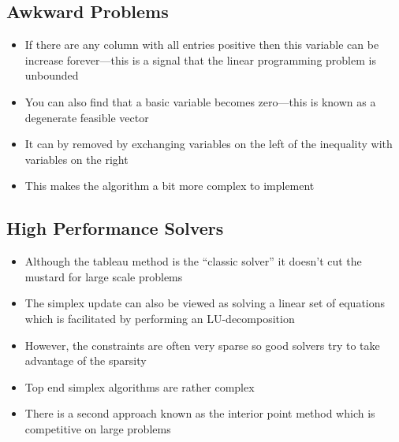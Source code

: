\begin{slide}
\section{Awkward Problems}

\begin{PauseHighLight}
  \begin{itemize}
  \item If there are any column with all entries positive then this
    variable can be increase forever---this is a signal that the linear
    programming problem is unbounded\pause
  \item You can also find that a basic variable becomes zero---this is
    known as a degenerate feasible vector\pause
  \item It can by removed by exchanging variables on the left of the
    inequality with variables on the right\pause
  \item This makes the algorithm a bit more complex to implement\pause
  \end{itemize}
\end{PauseHighLight}

\end{slide}

\begin{slide}
\section[-1]{High Performance Solvers}

\begin{PauseHighLight}
  \begin{itemize}
  \item Although the tableau method is the ``classic solver'' it doesn't
    cut the mustard for large scale problems\pause
  \item The simplex update can also be viewed as solving a linear set of
    equations which is facilitated by performing an LU-decomposition\pause
  \item However, the constraints are often very sparse so good solvers
    try to take advantage of the sparsity\pause
  \item Top end simplex algorithms are rather complex\pause
  \item There is a second approach known as the interior point method
    which is competitive on large problems\pause
  \end{itemize}
\end{PauseHighLight}

\end{slide}

